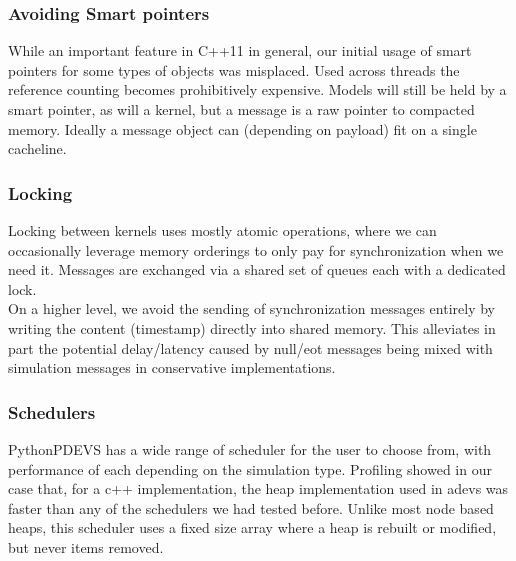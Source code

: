 \subsubsection{Avoiding Smart pointers}
While an important feature in C++11 in general, our initial usage of smart pointers for some types of objects was misplaced. Used across threads the reference counting becomes prohibitively expensive. Models will still be held by a smart pointer, as will a kernel, but a message is a raw pointer to compacted memory. Ideally a message object can (depending on payload) fit on a single cacheline.\\
\subsubsection{Locking}
Locking between kernels uses mostly atomic operations, where we can occasionally leverage memory orderings to only pay for synchronization when we need it. Messages are exchanged via a shared set of queues each with a dedicated lock.\\
On a higher level, we avoid the sending of synchronization messages entirely by writing the content (timestamp) directly into shared memory. This alleviates in part the potential delay/latency caused by null/eot messages being mixed with simulation messages in conservative implementations. 
\subsubsection{Schedulers}
PythonPDEVS has a wide range of scheduler for the user to choose from, with performance of each depending on the simulation type. Profiling showed in our case that, for a c++ implementation, the heap implementation used in adevs was faster than any of the schedulers we had tested before. Unlike most node based heaps, this scheduler uses a fixed size array where a heap is rebuilt or modified, but never items removed. %

